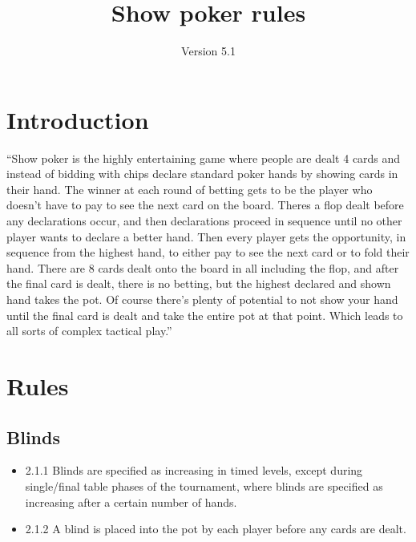\documentclass[a4paper,12pt]{article}
\title{Show poker rules}
\author{Version 5.1}
\begin{document}
\maketitle
\pagebreak
\tableofcontents

\pagebreak

\section{Introduction}
“Show poker is the highly entertaining game where people are dealt 4 cards and instead of bidding with chips declare standard poker hands by showing cards in their hand. The winner at each round of betting gets to be the player who doesn’t have to pay to see the next card on the board. Theres a flop dealt before any declarations occur, and then declarations proceed in sequence until no other player wants to declare a better hand. Then every player gets the opportunity, in sequence from the highest hand, to either pay to see the next card or to fold their hand. There are 8 cards dealt onto the board in all including the flop, and after the final card is dealt, there is no betting, but the highest declared and shown hand takes the pot. Of course there’s plenty of potential to not show your hand until the final card is dealt and take the entire pot at that point. Which leads to all sorts of complex tactical play.” 

\pagebreak
\section{Rules}
\subsection{Blinds}
\begin{itemize}

\item
2.1.1 Blinds are specified as increasing in timed levels, except during single/final table phases of the tournament, where blinds are specified as increasing after a certain number of hands.
\item
2.1.2 A blind is placed into the pot by each player before any cards are dealt.


\end{itemize}
\end{document}
